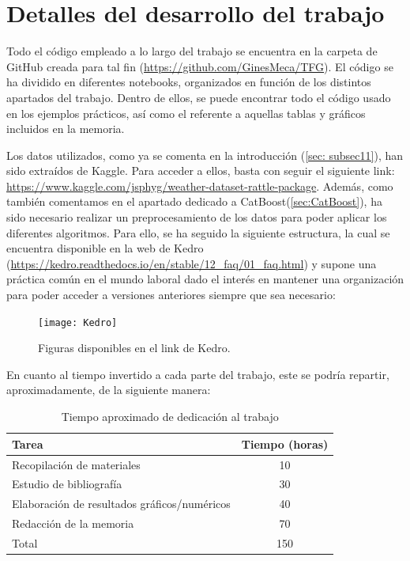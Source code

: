 \documentclass[12pt,twoside]{article}
\begin{document}
\newpage
\appendix
\section{Detalles del desarrollo del trabajo} \label{Anexo}

Todo el código empleado a lo largo del trabajo se encuentra en la carpeta de GitHub creada para tal fin (\url{https://github.com/GinesMeca/TFG}). El código se ha dividido en diferentes notebooks, organizados en función de los distintos apartados del trabajo. Dentro de ellos, se puede encontrar todo el código usado en los ejemplos prácticos, así como el referente a aquellas tablas y gráficos incluidos en la memoria.

Los datos utilizados, como ya se comenta en la introducción (\ref{sec: subsec11}), han sido extraídos de Kaggle. Para acceder a ellos, basta con seguir el siguiente link: \url{https://www.kaggle.com/jsphyg/weather-dataset-rattle-package}. Además, como también comentamos en el apartado dedicado a CatBoost(\ref{sec:CatBoost}), ha sido necesario realizar un preprocesamiento de los datos para poder aplicar los diferentes algoritmos. Para ello, se ha seguido la siguiente estructura, la cual se encuentra disponible en la web de Kedro (\url{https://kedro.readthedocs.io/en/stable/12_faq/01_faq.html}) y supone una práctica común en el mundo laboral dado el interés en mantener una organización para poder acceder a versiones anteriores siempre que sea necesario:
\begin{figure}[h]
\centering
\texttt{[image: Kedro]}
\caption{Figuras disponibles en el link de Kedro.}
\end{figure}


En cuanto al tiempo invertido a cada parte del trabajo, este se podría repartir, aproximadamente, de la siguiente manera:
\begin{table}[ht] 
\centering
\begin{tabular}{lc} 
  \hline
 Tarea & Tiempo (horas) \\ 
  \hline
Recopilación de materiales &   10 \\ 
Estudio de bibliografía &   30\\ 
Elaboración de resultados gráficos/numéricos &  40 \\ 
Redacción de la memoria &  70 \\
 \hline
Total & 150\\
\hline
\end{tabular}
\caption{Tiempo aproximado de dedicación al trabajo} \label{tab{02}}
\end{table}
\end{document}
